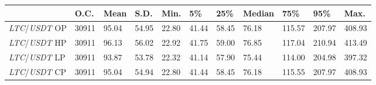 \begin{tabular}{lllllllllll}
\toprule
 & \textbf{O.C.} & \textbf{Mean} & \textbf{S.D.} & \textbf{Min.} & \textbf{5\%} & \textbf{25\%} & \textbf{Median} & \textbf{75\%} & \textbf{95\%} & \textbf{Max.} \\
\midrule
\emph{LTC}/\emph{USDT} OP & 30911 & 95.04 & 54.95 & 22.80 & 41.44 & 58.45 & 76.18 & 115.57 & 207.97 & 408.93 \\
\emph{LTC}/\emph{USDT} HP & 30911 & 96.13 & 56.02 & 22.92 & 41.75 & 59.00 & 76.85 & 117.04 & 210.94 & 413.49 \\
\emph{LTC}/\emph{USDT} LP & 30911 & 93.87 & 53.78 & 22.32 & 41.14 & 57.90 & 75.44 & 114.00 & 204.98 & 397.32 \\
\emph{LTC}/\emph{USDT} CP & 30911 & 95.04 & 54.94 & 22.80 & 41.44 & 58.45 & 76.18 & 115.55 & 207.97 & 408.93 \\
\bottomrule
\end{tabular}
